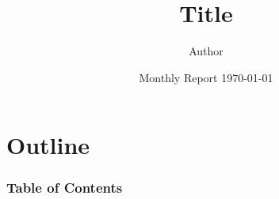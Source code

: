 \documentclass[11pt]{beamer}
\title[T]{Title}
\author[Author]{Author\inst{1}}
\date[Monthly Report]{Monthly Report \today}
\institute[*]{\inst{1} ***}
\begin{document}
\begin{frame}[plain]
    \titlepage
\end{frame}

\section*{Outline}
\begin{frame}[allowframebreaks] %
    \frametitle{Table of Contents}
    \tableofcontents[hideallsubsections] %
\end{frame}
\end{document}
